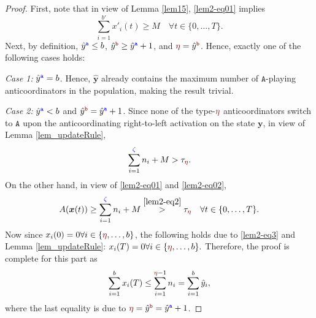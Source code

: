\documentclass[10 pt,twocolumn,journal]{IEEEtran}
\theoremstyle{plain}
\newcommand{\A}{\mathcal{A}}
\newcommand{\x}{\bm{x}}
\newcommand{\y}{\bm{y}}
\renewcommand{\r}{\tb{\zeta}}
\newcommand{\s}{\tr{\eta}}
\newcommand{\n}{\tb{\mathtt{a}}}
\renewcommand{\o}{\tr{\mathtt{b}}}
\renewcommand{\A}{\mathtt{A}}
\newcommand{\B}{\mathtt{B}}
\newcommand{\tb}{\textcolor{blue}}
\newcommand{\tr}{\textcolor{Myred}}
\theoremstyle{definition}
\begin{document}
\begin{proof}
    First, note that in view of Lemma \ref{lem15}, \eqref{lem2-eq01} implies
    \begin{equation}    \label{lem2-eq02}
        \sum_{i = 1}^{b'}x'_i(t) 
        \geq M \quad \forall t\in\{0,\ldots, T\}.
    \end{equation}
    Next, by definition, $\hat{y}^{\n} \leq b$,
    $\hat{y}^{\o} \geq \hat{y}^{\n}+1$, and $\s=\hat{y}^{\o}$. Hence,
    exactly one of the following cases holds:
    
    \emph{Case 1:} $\hat{y}^{\n} = b$.
    Hence, $\hat{\y}$ already contains the maximum number of $\A$-playing anticoordinators in the population, making the result trivial.
    
    \emph{Case 2:} $\hat{y}^{\n} < b$ and $\hat{y}^{\o}= \hat{y}^{\n}+1$.
    Since none of the type-$\s$ anticoordinators switch to $\A$ upon the anticoordinating right-to-left activation on the state $\y$, 
    in view of Lemma \ref{lem_updateRule}, 
    \begin{equation}    \label{lem2-eq2}
        \sum_{i=1}^{\r} n_i + M > {\tau_{\s}}.
    \end{equation}
    On the other hand, in view of \eqref{lem2-eq01} and \eqref{lem2-eq02}, 
    \begin{equation}    \label{lem2-eq3}
        A(\x(t)) 
         \geq \sum_{i=1}^{\r} n_i + M 
         \overset{\eqref{lem2-eq2}}{>} {\tau_{\s}} 
         \quad \forall t\in\{0,\ldots,T\}. 
    \end{equation}
    Now since
    $
        x_i(0) = 0  \forall i\in\{\s,\ldots, b\}
    $,
    the following holds due to \eqref{lem2-eq3} and Lemma \ref{lem_updateRule}:
    $
        x_i(T)  = 0  \forall i\in\{\s,\ldots, b\}.
    $
    Therefore, the proof is complete for this part as
    \begin{equation*}
         \sum_{i=1}^b x_i(T) 
         \leq \sum_{i=1}^{\s-1} n_i
         = \sum_{i=1}^b\hat{y}_i,
    \end{equation*}
    where the last equality is due to $\s= \hat{y}^{\o}= \hat{y}^{\n}+1$.
    

\end{proof}
\end{document}
